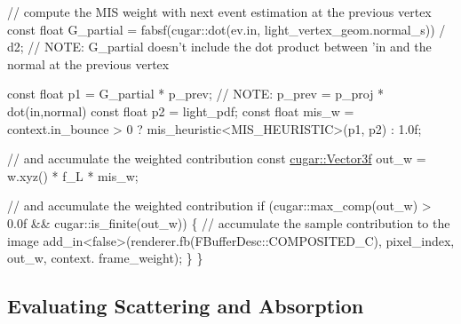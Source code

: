 \begin{DoxyParagraph}{}
\begin{DoxyCodeInclude}
            \textcolor{comment}{// compute the MIS weight with next event estimation at the previous vertex}
            \textcolor{keyword}{const} \textcolor{keywordtype}{float} G\_partial = fabsf(cugar::dot(ev.in, light\_vertex\_geom.normal\_s)) / d2;
                \textcolor{comment}{// NOTE: G\_partial doesn't include the dot product between 'in and the normal at the
       previous vertex}

            \textcolor{keyword}{const} \textcolor{keywordtype}{float} p1 = G\_partial * p\_prev; \textcolor{comment}{// NOTE: p\_prev = p\_proj * dot(in,normal)}
            \textcolor{keyword}{const} \textcolor{keywordtype}{float} p2 = light\_pdf;
            \textcolor{keyword}{const} \textcolor{keywordtype}{float} mis\_w = context.in\_bounce > 0 ? mis\_heuristic<MIS\_HEURISTIC>(p1, p2) : 1.0f;

            \textcolor{comment}{// and accumulate the weighted contribution}
            \textcolor{keyword}{const} \hyperlink{structcugar_1_1_vector}{cugar::Vector3f} out\_w  = w.xyz() * f\_L * mis\_w;

            \textcolor{comment}{// and accumulate the weighted contribution}
            \textcolor{keywordflow}{if} (cugar::max\_comp(out\_w) > 0.0f && cugar::is\_finite(out\_w))
            \{
                \textcolor{comment}{// accumulate the sample contribution to the image}
                add\_in<false>(renderer.fb(FBufferDesc::COMPOSITED\_C), pixel\_index, out\_w, context.
      frame\_weight);
            \}
        \}
\end{DoxyCodeInclude}
 
\end{DoxyParagraph}
\hypertarget{_hello_renderer_page_EvaluatingScatteringAbsorptionSection}{}\subsection{Evaluating Scattering and Absorption}\label{_hello_renderer_page_EvaluatingScatteringAbsorptionSection}
